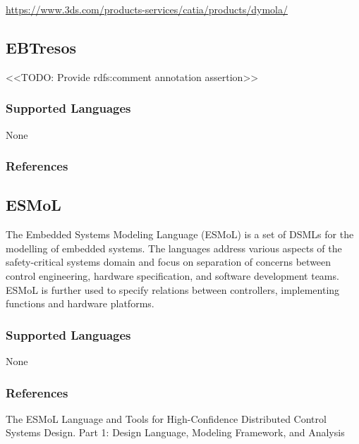 \url{https://www.3ds.com/products-services/catia/products/dymola/}



\subsection{EBTresos}
\label{subsecT:EBTresos}

<<TODO: Provide rdfs:comment annotation assertion>>

\subsubsection{Supported Languages}

None


\subsubsection{References}





\subsection{ESMoL}
\label{subsecT:ESMoL}


The Embedded Systems Modeling Language (ESMoL) is a set of DSMLs for the modelling of embedded systems.
The languages address various aspects of the safety-critical systems domain and focus on separation of concerns between
control engineering, hardware specification, and software development teams.
ESMoL is further used to specify relations between controllers, implementing functions and hardware platforms.

\subsubsection{Supported Languages}

None


\subsubsection{References}

The ESMoL Language and Tools for High-Confidence Distributed
Control Systems Design. Part 1: Design Language, Modeling Framework, and Analysis

